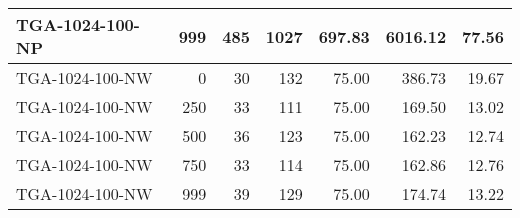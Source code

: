 \begin{table}[htbp]
{\begin{tabular}{lrrrrrr}
    TGA-1024-100-NP & 999    & 485    & 1027   & 697.83 & 6016.12 & 77.56 \\ \hline
    TGA-1024-100-NW & 0      & 30     & 132    & 75.00  & 386.73 & 19.67 \\
    TGA-1024-100-NW & 250    & 33     & 111    & 75.00  & 169.50 & 13.02 \\
    TGA-1024-100-NW & 500    & 36     & 123    & 75.00  & 162.23 & 12.74 \\
    TGA-1024-100-NW & 750    & 33     & 114    & 75.00  & 162.86 & 12.76 \\
    TGA-1024-100-NW & 999    & 39     & 129    & 75.00  & 174.74 & 13.22 \\
    \bottomrule
    \end{tabular}}
  \label{tab:addlabel}%
\end{table}%
